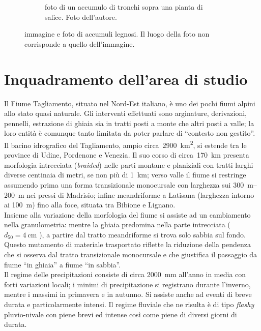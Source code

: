 \begin{figure}
\begin{subfigure}[b]{0.44\textwidth}
		\caption{foto di un accumulo di tronchi sopra una pianta di salice.
		Foto dell'autore.}
		\label{fig:esempio-accumulo-1}
	\end{subfigure}
	\caption[immagine e foto di accumuli legnosi]{immagine e foto di accumuli legnosi. Il luogo della foto non corrisponde a quello dell'immagine.}
\end{figure}


\section{Inquadramento dell'area di studio}
Il Fiume Tagliamento, situato nel Nord-Est italiano, è uno dei pochi fiumi alpini allo stato quasi naturale. 
Gli interventi effettuati sono arginature, derivazioni, pennelli, estrazione di ghiaia sia in tratti posti a monte che altri posti a valle; la loro entità è comunque tanto limitata da poter parlare di “contesto non gestito”.
\\
Il bacino idrografico del Tagliamento, ampio circa~\SI{2900}{\kilo\m\tothe{2}}, si estende tra le province di Udine, Pordenone e Venezia.
Il suo corso di circa~\SI{170}{\kilo\m} presenta morfologia intrecciata (\emph{braided}) nelle parti montane e planiziali con tratti larghi diverse centinaia di metri, se non più di \SI{1}{\kilo\m};
verso valle il fiume si restringe assumendo prima una forma transizionale monocursale con larghezza sui \SIrange[range-phrase={-}]{300}{200}{\m} nei pressi di Madrisio;
infine meandriforme a Latisana (larghezza intorno ai \SI{100}{\m}) fino alla foce, situata tra Bibione e Lignano.
\\
Insieme alla variazione della morfologia del fiume si assiste ad un cambiamento nella granulometria: mentre la ghiaia predomina nella parte intrecciata ($d_{50} = \SI{4}{\centi\m}$ ), a partire dal tratto meandriforme si trova solo sabbia sul fondo.
Questo mutamento di materiale trasportato riflette la riduzione della pendenza che si osserva dal tratto transizionale monocursale e che giustifica il passaggio da fiume “in ghiaia” a fiume “in sabbia”.
\\
Il regime delle precipitazioni consiste di circa \SI{2000}{\mm} all'anno in media con forti variazioni locali; i minimi di precipitazione si registrano durante l'inverno, mentre i massimi in primavera e in autunno. Si assiste anche ad eventi di breve durata e particolarmente intensi.
Il regime fluviale che ne risulta è di tipo \emph{flashy} pluvio-nivale con piene brevi ed intense così come piene di diversi giorni di durata.

